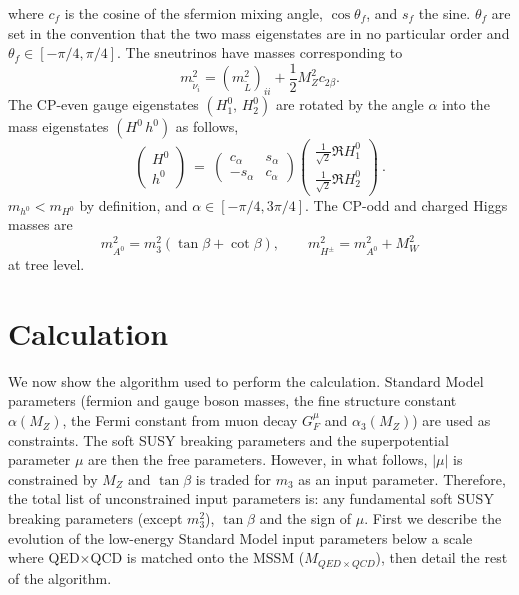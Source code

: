 \documentclass{article}
\def\half{\frac{1}{2}}
\begin{document}
%
where $c_f$ is the cosine of the sfermion mixing angle,
$\cos\theta_f$, and $s_f$ the sine. 
$\theta_f$ are set in the convention that the two mass eigenstates are in no
particular order and $\theta_f \in [-\pi/4, \pi/4]$. The sneutrinos have
masses corresponding to
\begin{equation}
m_{\tilde \nu_i}^2 = (m_{\tilde L}^2)_{ii} + \half M_Z^2 c_{2\beta}.
\end{equation}
The CP-even gauge eigenstates $(H_1^0,\, H_2^0)$ are rotated by the angle
$\alpha$ into the mass eigenstates $(H^0\, h^0)$ as follows,
%
\begin{equation}
\left(\begin{array}{c}H^0\\h^0\end{array}\right) \ =
\ \left(\begin{array}{cc} c_\alpha & s_\alpha\\-s_\alpha & c_\alpha
\end{array}\right)\left(\begin{array}{c} \frac{1}{\sqrt{2}} \Re  H_1^0
  \\\frac{1}{\sqrt{2}} \Re H_2^0\end{array}\right)~.
\label{rotateh}
\end{equation}
$m_{h^0} < m_{H^0}$ by
definition, and $\alpha \in [-\pi/4, 3 \pi/4]$.
The CP-odd and charged Higgs masses are
\begin{equation}
m_{A^0}^2 = m_3^2 (\tan \beta + \cot \beta),\qquad
m_{H^\pm}^2 = m_{A^0}^2 + M_W^2
\end{equation}
at tree level. 

\section{Calculation \label{sec:calculation}}

We now show the algorithm used to perform the calculation.
Standard Model parameters (fermion and gauge boson masses,
the fine structure constant $\alpha (M_Z)$, the Fermi constant from muon decay
$G_F^\mu$ and $\alpha_3(M_Z)$) are used as constraints. 
The soft SUSY breaking parameters and the superpotential parameter $\mu$ 
are then the free parameters. However, in what follows, $|\mu|$ is constrained
by $M_Z$ and $\tan \beta$ is traded for $m_3$ as an input parameter.
Therefore, the total list of unconstrained input parameters is: any
fundamental soft 
SUSY breaking parameters (except $m_3^2$), $\tan \beta$ and the sign
of $\mu$. 
First we describe the evolution of the low-energy Standard Model input
parameters below a scale where QED$\times$QCD is matched onto the MSSM
($M_{QED \times QCD}$), then detail the rest of the algorithm.
\end{document}
